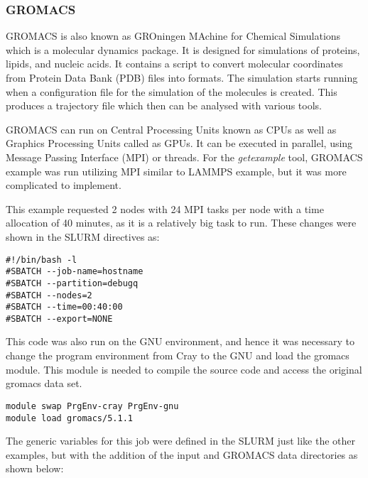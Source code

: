 \subsubsection{GROMACS}

GROMACS is also known as GROningen MAchine for Chemical Simulations which is a molecular dynamics package. It is designed for simulations of proteins, 
lipids, and nucleic acids. It contains a script to convert molecular coordinates from Protein Data Bank (PDB) files into formats. The simulation starts 
running when a configuration file for the simulation of the molecules is created. This produces a trajectory file which then can be analysed with various 
tools.

GROMACS can run on Central Processing Units known as CPUs as well as Graphics Processing Units called as GPUs. It can be executed in parallel, using 
Message Passing Interface (MPI) or threads. For the \emph{getexample} tool, GROMACS example was run utilizing MPI similar to LAMMPS example, but it was 
more complicated to implement.

This example requested 2 nodes with 24 MPI tasks per node with a time allocation of 40 minutes, as it is a relatively big task to run. These changes
were shown in the SLURM directives as:

\begin{tcolorbox}
\begin{Verbatim}[fontsize=\scriptsize]
#!/bin/bash -l
#SBATCH --job-name=hostname
#SBATCH --partition=debugq
#SBATCH --nodes=2
#SBATCH --time=00:40:00
#SBATCH --export=NONE
\end{Verbatim}
\end{tcolorbox}

This code was also run on the GNU environment, and hence it was necessary to change the program environment from Cray to the GNU and load the gromacs
module. This module is needed to compile the source code and access the original gromacs data set.

\begin{tcolorbox}
\begin{Verbatim}[fontsize=\scriptsize]
module swap PrgEnv-cray PrgEnv-gnu
module load gromacs/5.1.1
\end{Verbatim}
\end{tcolorbox}

The generic variables for this job were defined in the SLURM just like the other examples, but with the addition of the input and GROMACS data 
directories as shown below:

